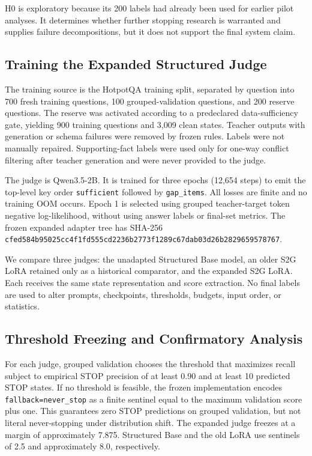\documentclass[11pt,a4paper]{article}
\newcommand{\model}[1]{\texttt{#1}}
\begin{document}
H0 is exploratory because its 200 labels had already been used for earlier pilot analyses. It determines whether further stopping research is warranted and supplies failure decompositions, but it does not support the final system claim.

\subsection{Training the Expanded Structured Judge}

The training source is the HotpotQA training split, separated by question into 700 fresh training questions, 100 grouped-validation questions, and 200 reserve questions. The reserve was activated according to a predeclared data-sufficiency gate, yielding 900 training questions and 3,009 clean states. Teacher outputs with generation or schema failures were removed by frozen rules. Labels were not manually repaired. Supporting-fact labels were used only for one-way conflict filtering after teacher generation and were never provided to the judge.

The judge is Qwen3.5-2B. It is trained for three epochs (12,654 steps) to emit the top-level key order \model{sufficient} followed by \model{gap\_items}. All losses are finite and no training OOM occurs. Epoch 1 is selected using grouped teacher-target token negative log-likelihood, without using answer labels or final-set metrics. The frozen expanded adapter tree has SHA-256 \nolinkurl{cfed584b95025cc4f1fd555cd2236b2773f1289c67dab03d26b2829659578767}.

We compare three judges: the unadapted Structured Base model, an older S2G LoRA retained only as a historical comparator, and the expanded S2G LoRA. Each receives the same state representation and score extraction. No final labels are used to alter prompts, checkpoints, thresholds, budgets, input order, or statistics.

\subsection{Threshold Freezing and Confirmatory Analysis}

For each judge, grouped validation chooses the threshold that maximizes recall subject to empirical STOP precision of at least 0.90 and at least 10 predicted STOP states. If no threshold is feasible, the frozen implementation encodes \model{fallback=never\_stop} as a finite sentinel equal to the maximum validation score plus one. This guarantees zero STOP predictions on grouped validation, but not literal never-stopping under distribution shift. The expanded judge freezes at a margin of approximately 7.875. Structured Base and the old LoRA use sentinels of 2.5 and approximately 8.0, respectively.
\end{document}
